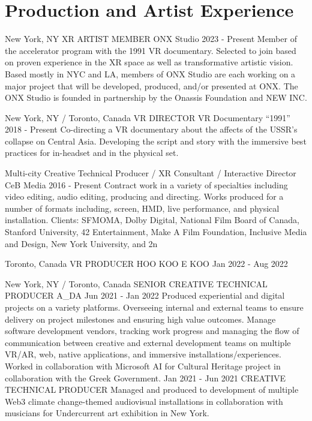 \documentclass[11pt,a4paper,sans]{moderncv}   %
\begin{document}
\makecvtitle

\section{Production and Artist Experience}

\cventry
  {New York, NY}
  {XR ARTIST MEMBER}
  {ONX Studio}
  {2023 - Present}{}
  {Member of the accelerator program with the 1991 VR documentary. Selected to join based on proven experience in the XR space as well as transformative artistic vision. Based mostly in NYC and LA, members of ONX Studio are each working on a major project that will be developed, produced, and/or presented at ONX. The ONX Studio is founded in partnership by the Onassis Foundation and NEW INC.}

\cventry
  {New York, NY / Toronto, Canada}
  {VR DIRECTOR}
  {VR Documentary “1991”}
  {2018 - Present}{}
  {Co-directing a VR documentary about the affects of the USSR’s collapse on Central Asia. Developing the script and story with the immersive best practices for in-headset and in the physical set.
  }

\cventry
  {Multi-city}
  {Creative Technical Producer / XR Consultant / Interactive Director}
  {CeB Media}
  {2016 - Present}{}
  {Contract work in a variety of specialties including video editing,
  audio editing, producing and directing. Works produced for
  a number of formats including, screen, HMD, live performance,
  and physical installation. Clients: SFMOMA, Dolby Digital, National Film Board of Canada,
  Stanford University, 42 Entertainment, Make A Film Foundation,
  Inclusive Media and Design, New York University, and 2n}

\cventry
  {Toronto, Canada}
  {VR PRODUCER}
  {HOO KOO E KOO}
  {Jan 2022 - Aug 2022}{}
  {}

\cventry
  {New York, NY / Toronto, Canada}
  {SENIOR CREATIVE TECHNICAL PRODUCER}
  {A\_DA}
  {Jun 2021 - Jan 2022}{}
  {Produced experiential and digital projects on a variety platforms. Overseeing internal and external teams to ensure delivery on project milestones and ensuring high value outcomes. Manage software development vendors, tracking work progress and managing the flow of communication between creative and external development teams on multiple VR/AR, web, native applications, and immersive installations/experiences. Worked in collaboration with Microsoft AI for Cultural Heritage project in collaboration with the Greek Government.}
\cventry
  {Jan 2021 - Jun 2021}
  {CREATIVE TECHNICAL PRODUCER}
  {}
  {}{}
  {Managed and produced to development of multiple Web3 climate change-themed audiovisual installations in collaboration with musicians for Undercurrent art exhibition in New York.}
\end{document}
